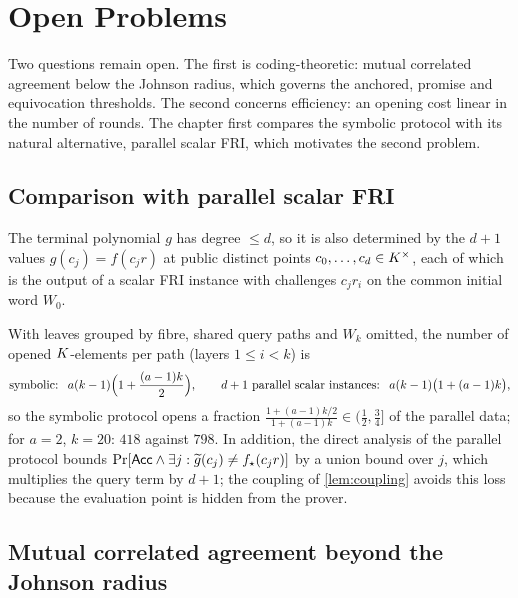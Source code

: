 \chapter{Open Problems}
\label{ch:open}

Two questions remain open. The first is coding-theoretic: mutual correlated agreement
below the Johnson radius, which governs the anchored, promise and equivocation thresholds.
The second concerns efficiency: an opening cost linear in the number of rounds. The chapter
first compares the symbolic protocol with its natural alternative, parallel scalar FRI,
which motivates the second problem.

\section{Comparison with parallel scalar FRI}

The terminal polynomial $g$ has degree $\le d$, so it is also determined by the $d+1$
values $g(c_j)=f(c_jr)$ at public distinct points $c_0,\dots,c_d\in K^\times$, each of which
is the output of a scalar FRI instance with challenges $c_jr_i$ on the common initial word
$W_0$.

\begin{remark}\label{rem:parallel}
With leaves grouped by fibre, shared query paths and $W_k$ omitted, the number of opened
$K$-elements per path (layers $1\le i<k$) is
\[
\text{symbolic: }\ a(k-1)\Bigl(1+\frac{(a-1)k}2\Bigr),\qquad
\text{$d+1$ parallel scalar instances: }\ a(k-1)\bigl(1+(a-1)k\bigr),
\]
so the symbolic protocol opens a fraction
$\frac{1+(a-1)k/2}{1+(a-1)k}\in(\frac12,\frac34]$ of the parallel data; for $a=2$, $k=20$:
$418$ against $798$. In addition, the direct analysis of the parallel protocol bounds
$\Pr[\mathsf{Acc}\wedge\exists j:\widetilde g(c_j)\ne f_\star(c_jr)]$ by a union bound over $j$, which
multiplies the query term by $d+1$; the coupling of \cref{lem:coupling} avoids this loss
because the evaluation point is hidden from the prover.
\end{remark}

\section{Mutual correlated agreement beyond the Johnson radius}

